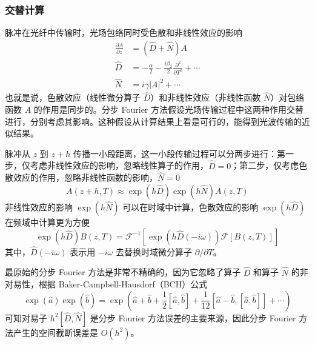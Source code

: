 \subsubsection{交替计算}
脉冲在光纤中传输时，光场包络同时受色散和非线性效应的影响
\begin{align}
    \frac{\partial A}{\partial z}&=\left(\hat{D}+\hat{N}\right)A \\
    \hat{D}&=-\frac{\alpha}{2}-\frac{i\beta_2}{2}\frac{\partial^2}{\partial T^2}+\cdots \nonumber \\
    \hat{N}&=i\gamma|A|^2+\cdots \nonumber
\end{align}
也就是说，色散效应（线性微分算子 $\hat{D}$）和非线性效应（非线性函数 $\hat{N}$）对包络函数 $A$ 的作用是同步的。分步 Fourier 方法假设光场传输过程中这两种作用交替进行，分别考虑其影响。这种假设从计算结果上看是可行的，能得到光波传输的近似结果\cite{Agrawal,Fisher}。

脉冲从 $z$ 到 $z+h$ 传播一小段距离，这一小段传输过程可以分两步进行：第一步，仅考虑非线性效应的影响，忽略线性算子的作用，$\hat{D}=0$；第二步，仅考虑色散效应的作用，忽略非线性函数的影响，$\hat{N}=0$
\begin{equation}
    A(z+h,T)\approx\exp(h\hat{D})\exp(h\hat{N})A(z,T)
\end{equation}
非线性效应的影响 $\exp(h\hat{N})$ 可以在时域中计算，色散效应的影响 $\exp(h\hat{D})$ 在频域中计算更为方便
\begin{equation}
    \exp(h\hat{D})B(z,T)=\mathscr{F}^{-1}\left[\exp(h\hat{D}(-i\omega))\mathscr{F}[B(z,T)]\right]
\end{equation}
其中，$\hat{D}(-i\omega)$ 表示用 $-i\omega$ 去替换时域微分算子 $\partial/\partial T$\cite{Agrawal}。

最原始的分步 Fourier 方法是非常不精确的，因为它忽略了算子 $\hat{D}$ 和算子 $\hat{N}$ 的非对易性，根据 Baker-Campbell-Hausdorf（BCH）公式
\begin{equation}
    \exp(\hat{a})\exp(\hat{b})=\exp\left(\hat{a}+\hat{b}+\frac{1}{2}[\hat{a},\hat{b}]+\frac{1}{12}[\hat{a}-\hat{b},[\hat{a},\hat{b}]]+\cdots\right)
\end{equation}
可知对易子 $h^2[\hat{D},\hat{N}]$ 是分步 Fourier 方法误差的主要来源，因此分步 Fourier 方法产生的空间截断误差是 $O(h^2)$。
